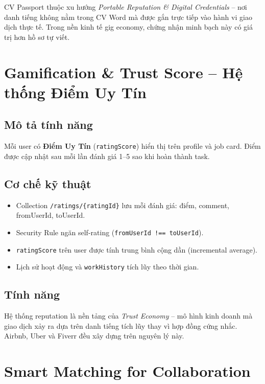 CV Passport thuộc xu hướng \textit{Portable Reputation \& Digital Credentials} -- nơi
danh tiếng không nằm trong CV Word mà được gắn trực tiếp vào hành vi giao dịch thực tế.
Trong nền kinh tế gig economy, chứng nhận minh bạch này có giá trị hơn hồ sơ tự viết.

\section{Gamification \& Trust Score -- Hệ thống Điểm Uy Tín}

\subsection*{Mô tả tính năng}

Mỗi user có \textbf{Điểm Uy Tín} (\texttt{ratingScore}) hiển thị trên profile và job card.
Điểm được cập nhật sau mỗi lần đánh giá 1--5 sao khi hoàn thành task.

\subsection*{Cơ chế kỹ thuật}

\begin{itemize}
  \item Collection \texttt{/ratings/\{ratingId\}} lưu mỗi đánh giá: điểm, comment,
    fromUserId, toUserId.
  \item Security Rule ngăn self-rating (\texttt{fromUserId !== toUserId}).
  \item \texttt{ratingScore} trên user được tính trung bình cộng dần (incremental average).
  \item Lịch sử hoạt động và \texttt{workHistory} tích lũy theo thời gian.
\end{itemize}

\subsection*{Tính năng}

Hệ thống reputation là nền tảng của \textit{Trust Economy} -- mô hình kinh doanh mà giao
dịch xảy ra dựa trên danh tiếng tích lũy thay vì hợp đồng cứng nhắc. Airbnb, Uber và
Fiverr đều xây dựng trên nguyên lý này.

\section{Smart Matching for Collaboration}

